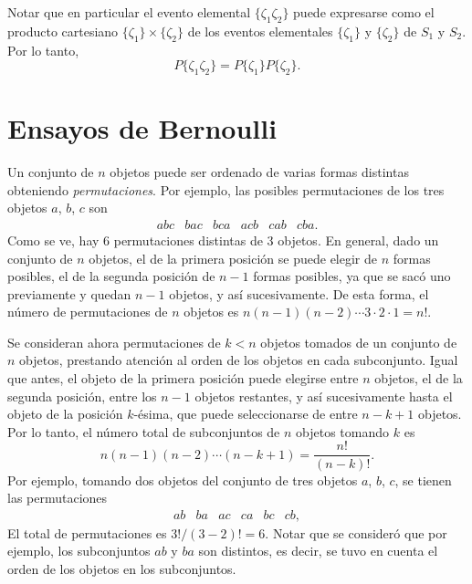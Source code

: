 \documentclass[a4paper]{report}
\begin{document}
Notar que en particular el evento elemental \(\{\zeta_1\zeta_2\}\) puede expresarse como el producto cartesiano \(\{\zeta_1\}\times\{\zeta_2\}\) de los eventos elementales \(\{\zeta_1\}\) y \(\{\zeta_2\}\) de \(S_1\) y \(S_2\). Por lo tanto,
\[
 P\{\zeta_1\zeta_2\}=P\{\zeta_1\}P\{\zeta_2\}.
\]

\section{Ensayos de Bernoulli}\label{sec:bernoulli_trials}

Un conjunto de \(n\) objetos puede ser ordenado de varias formas distintas obteniendo \emph{permutaciones}. Por ejemplo, las posibles permutaciones de los tres objetos \(a\), \(b\), \(c\) son
\[
 \begin{array}{llllll}
  abc & bac & bca & acb & cab & cba.
 \end{array}
\]
Como se ve, hay 6 permutaciones distintas de 3 objetos. En general, dado un conjunto de \(n\) objetos, el de la primera posición se puede elegir de \(n\) formas posibles, el de la segunda posición de \(n-1\) formas posibles, ya que se sacó uno previamente y quedan \(n-1\) objetos, y así sucesivamente. De esta forma, el número de permutaciones de \(n\) objetos es \(n(n-1)(n-2)\cdots3\cdot2\cdot1=n!\).

Se consideran ahora permutaciones de \(k<n\) objetos tomados de un conjunto de \(n\) objetos, prestando atención al orden de los objetos en cada subconjunto. Igual que antes, el objeto de la primera posición puede elegirse entre \(n\) objetos, el de la segunda posición, entre los \(n-1\) objetos restantes, y así sucesivamente hasta el objeto de la posición \(k\)-ésima, que puede seleccionarse de entre \(n-k+1\) objetos. Por lo tanto, el número total de subconjuntos de \(n\) objetos tomando \(k\) es
\[
 n(n-1)(n-2)\cdots(n-k+1)=\frac{n!}{(n-k)!}.
\]
Por ejemplo, tomando dos objetos del conjunto de tres objetos \(a\), \(b\), \(c\), se tienen las permutaciones
\[
 \begin{array}{llllll}
  ab & ba & ac & ca & bc & cb,
 \end{array}
\]
El total de permutaciones es \(3!/(3-2)!=6\). Notar que se consideró que por ejemplo, los subconjuntos \(ab\) y \(ba\) son distintos, es decir, se tuvo en cuenta el orden de los objetos en los subconjuntos.
\end{document}
